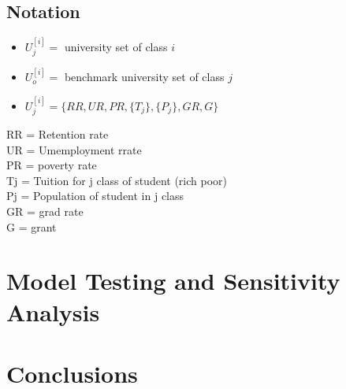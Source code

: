 \documentclass[12pt]{article}
\begin{document}
\subsection{Notation}
\begin{itemize}
\item $U_j^{[i]} = $ university set of class $i$
\item $U_o^{[i]} = $ benchmark university set of class $j$

\item $U_j^{[i]} = \{RR, UR, PR, \{T_j\}, \{P_j\}, GR, G   \} $


\end{itemize}
RR = Retention rate\\
UR = Umemployment rrate\\
PR = poverty rate\\
Tj = Tuition for j class of student (rich poor)\\
Pj = Population of student in j class\\
GR = grad rate\\
G  = grant\\


\section{Model Testing and Sensitivity Analysis} 

\section{Conclusions}
\clearpage
\end{document}
